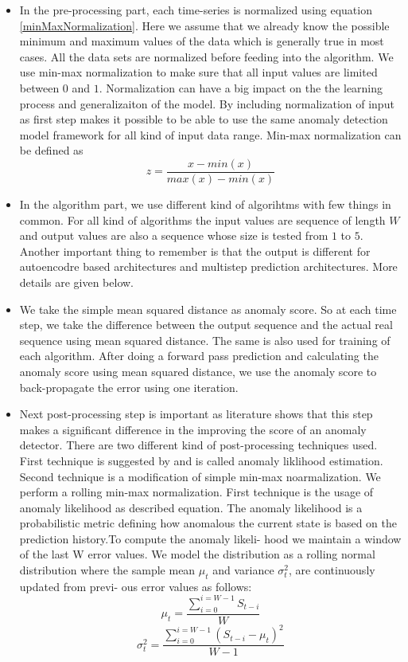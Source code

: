 \documentclass[12pt]{article}
\begin{document}
\begin{itemize}

\item In the pre-processing part, each time-series is normalized using equation \ref{minMaxNormalization}. Here we assume that we already know the possible minimum and maximum values of the data which is generally true in most cases. All the data sets are normalized before feeding into the algorithm.
We use min-max normalization to make sure that all input values are limited between $0$ and $1$. Normalization can have a big impact on the the learning process and generalizaiton of the model. By including normalization of input as first step makes it possible to be able to use the same anomaly detection model framework for all kind of input data range. Min-max normalization can be defined as
\begin{equation}
    z = \frac{x - min(x)}{max(x) - min(x)}
    \label{minMaxNormalization}
\end{equation}
\item In the algorithm part, we use different kind of algorihtms with few things in common. For all kind of algorithms the input values are sequence of length $W$ and output values are also a sequence whose size is tested from $1$ to $5$. Another important thing to remember is that the output is different for autoencodre based architectures and multistep prediction architectures. More details are given below.
\item We take the simple mean squared distance as anomaly score. So at each time step, we take the difference between the output sequence and the actual real sequence using mean squared distance. The same is also used for training of each algorithm. After doing a forward pass prediction and calculating the anomaly score using mean squared distance, we use the anomaly score to back-propagate the error using one iteration.
\item Next post-processing step is important as literature shows that this step makes a significant difference in the improving the score of an anomaly detector. There are two different kind of post-processing techniques used. First technique is suggested by \cite{ahmad2017unsupervised} and is called anomaly liklihood estimation. Second technique is a modification of simple min-max noarmalization. We perform a rolling min-max normalization.
First technique is the usage of anomaly likelihood as described equation.
The anomaly likelihood is a probabilistic metric defining how anomalous the current state is based on the prediction history.To compute the anomaly likeli-
hood we maintain a window of the last W error values. We model
the distribution as a rolling normal distribution where the sample
mean $\mu_t$ and variance $\sigma^2_t$, are continuously updated from previ-
ous error values as follows:
\begin{equation}
\mu_t = \frac{\sum_{i=0}^{i=W-1} S_{t-i}}{W}
\end{equation}
\begin{equation}
\sigma^2_t=\frac{\sum_{i=0}^{i=W-1} (S_{t-i}-\mu_t)^2}{W-1}
\end{equation}


\end{itemize}
\end{document}
